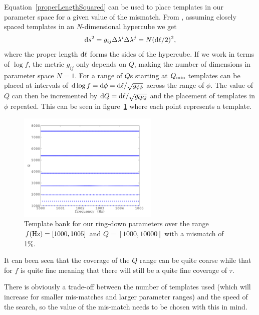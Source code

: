 Equation~\ref{properLengthSquared} can be used to place templates in our parameter space for a given
value of the mismatch. From \cite{Owen:1996}, assuming closely spaced templates in an
$N$-dimensional hypercube we get
\begin{equation}
{\rm d}s^2 = g_{ij}\Delta\lambda^i\Delta\lambda^j = N({\rm d}\ell/2)^2,
\end{equation}
where the proper length ${\rm d}\ell$ forms the sides of the hypercube. If we work in terms of
$\log{f}$, the metric $g_{ij}$ only depends on $Q$, making the number of dimensions in parameter
space $N=1$. For a range of $Q$s starting at $Q_{\rm min}$ templates can be placed at intervals of
${\rm d}\log{f} = {\rm d}\phi = {\rm d}\ell/\sqrt{g_{\phi\phi}}$ across the range of $\phi$. The
value of $Q$ can then be incremented by ${\rm d}Q = {\rm d}\ell/\sqrt{g_{QQ}}$ and the placement of
templates in $\phi$ repeated. This can be seen in figure~\ref{ringTemplates} where each point
represents a template.
\begin{figure}[!htbp]
\begin{center}
\includegraphics[width=0.6\textwidth]{figs/ringTemplates}\caption[Template bank for our ring-down
parameters $f$ and $Q$.]{Template bank for our ring-down parameters over the range $f ({\rm Hz}) =
[1000, 1005]$ and $Q = [1000, 10000]$ with a mismatch of 1\%.}\label{ringTemplates}
\end{center}
\end{figure}
It can been seen that the coverage of the $Q$ range can be quite coarse while that for $f$ is quite
fine meaning that there will still be a quite fine coverage of $\tau$.

There is obviously a trade-off between the number of templates used (which will increase for
smaller mis-matches and larger parameter ranges) and the speed of the search, so the value of the
mis-match needs to be chosen with this in mind.

